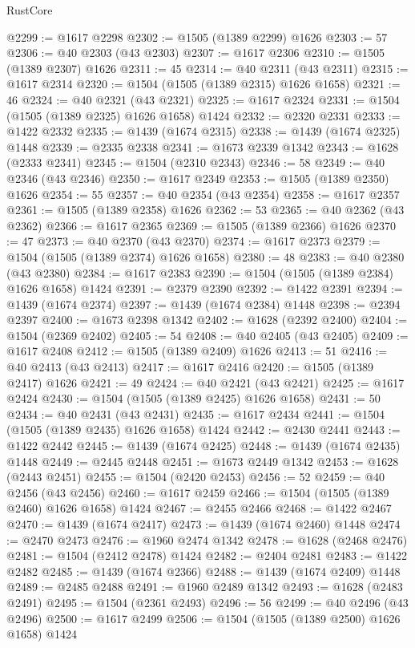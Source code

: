 \begin{lexlean}{RustCore}
\begin{coremodule}
@2299 := @1617 @2298
@2302 := @1505 (@1389 @2299) @1626
@2303 := 57
@2306 := @40 @2303 (@43 @2303)
@2307 := @1617 @2306
@2310 := @1505 (@1389 @2307) @1626
@2311 := 45
@2314 := @40 @2311 (@43 @2311)
@2315 := @1617 @2314
@2320 := @1504 (@1505 (@1389 @2315) @1626 @1658)
@2321 := 46
@2324 := @40 @2321 (@43 @2321)
@2325 := @1617 @2324
@2331 := @1504 (@1505 (@1389 @2325) @1626 @1658) @1424
@2332 := @2320 @2331
@2333 := @1422 @2332
@2335 := @1439 (@1674 @2315)
@2338 := @1439 (@1674 @2325) @1448
@2339 := @2335 @2338
@2341 := @1673 @2339 @1342
@2343 := @1628 (@2333 @2341)
@2345 := @1504 (@2310 @2343)
@2346 := 58
@2349 := @40 @2346 (@43 @2346)
@2350 := @1617 @2349
@2353 := @1505 (@1389 @2350) @1626
@2354 := 55
@2357 := @40 @2354 (@43 @2354)
@2358 := @1617 @2357
@2361 := @1505 (@1389 @2358) @1626
@2362 := 53
@2365 := @40 @2362 (@43 @2362)
@2366 := @1617 @2365
@2369 := @1505 (@1389 @2366) @1626
@2370 := 47
@2373 := @40 @2370 (@43 @2370)
@2374 := @1617 @2373
@2379 := @1504 (@1505 (@1389 @2374) @1626 @1658)
@2380 := 48
@2383 := @40 @2380 (@43 @2380)
@2384 := @1617 @2383
@2390 := @1504 (@1505 (@1389 @2384) @1626 @1658) @1424
@2391 := @2379 @2390
@2392 := @1422 @2391
@2394 := @1439 (@1674 @2374)
@2397 := @1439 (@1674 @2384) @1448
@2398 := @2394 @2397
@2400 := @1673 @2398 @1342
@2402 := @1628 (@2392 @2400)
@2404 := @1504 (@2369 @2402)
@2405 := 54
@2408 := @40 @2405 (@43 @2405)
@2409 := @1617 @2408
@2412 := @1505 (@1389 @2409) @1626
@2413 := 51
@2416 := @40 @2413 (@43 @2413)
@2417 := @1617 @2416
@2420 := @1505 (@1389 @2417) @1626
@2421 := 49
@2424 := @40 @2421 (@43 @2421)
@2425 := @1617 @2424
@2430 := @1504 (@1505 (@1389 @2425) @1626 @1658)
@2431 := 50
@2434 := @40 @2431 (@43 @2431)
@2435 := @1617 @2434
@2441 := @1504 (@1505 (@1389 @2435) @1626 @1658) @1424
@2442 := @2430 @2441
@2443 := @1422 @2442
@2445 := @1439 (@1674 @2425)
@2448 := @1439 (@1674 @2435) @1448
@2449 := @2445 @2448
@2451 := @1673 @2449 @1342
@2453 := @1628 (@2443 @2451)
@2455 := @1504 (@2420 @2453)
@2456 := 52
@2459 := @40 @2456 (@43 @2456)
@2460 := @1617 @2459
@2466 := @1504 (@1505 (@1389 @2460) @1626 @1658) @1424
@2467 := @2455 @2466
@2468 := @1422 @2467
@2470 := @1439 (@1674 @2417)
@2473 := @1439 (@1674 @2460) @1448
@2474 := @2470 @2473
@2476 := @1960 @2474 @1342
@2478 := @1628 (@2468 @2476)
@2481 := @1504 (@2412 @2478) @1424
@2482 := @2404 @2481
@2483 := @1422 @2482
@2485 := @1439 (@1674 @2366)
@2488 := @1439 (@1674 @2409) @1448
@2489 := @2485 @2488
@2491 := @1960 @2489 @1342
@2493 := @1628 (@2483 @2491)
@2495 := @1504 (@2361 @2493)
@2496 := 56
@2499 := @40 @2496 (@43 @2496)
@2500 := @1617 @2499
@2506 := @1504 (@1505 (@1389 @2500) @1626 @1658) @1424

\end{coremodule}
\end{lexlean}
